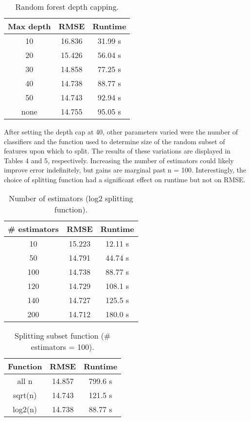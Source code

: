 \documentclass[11pt]{article}
\begin{document}
	\begin{table}[h!]
		\begin{center}
			\caption{Random forest depth capping.}
			\begin{tabular}{ c c c }
				\hline
				Max depth & RMSE & Runtime \\ \hline
				10 & 16.836 & 31.99 s \\
				20 & 15.426 & 56.04 s \\
				30 & 14.858 & 77.25 s \\
				40 & 14.738 & 88.77 s \\
				50 & 14.743 & 92.94 s \\
				none & 14.755 & 95.05 s \\
				\hline
			\end{tabular}
		\end{center}
	\end{table}
	
	After setting the depth cap at 40, other parameters varied
	were the number of classifiers and the function used to
	determine size of the random subset of features upon which
	to split. The results of these variations are displayed in Tables
	4 and 5, respectively. Increasing the number of estimators could 
	likely improve error indefinitely, but gains are marginal
	past n = 100. Interestingly,
	the choice of splitting function had a significant effect on
	runtime but not on RMSE.
	
	\begin{table}[h!]
		\begin{center}
			\caption{Number of estimators (log2 splitting function).}
			\begin{tabular}{ c c c }
				\hline
				\# estimators & RMSE & Runtime \\ \hline
				10 & 15.223 & 12.11 s \\
				50 & 14.791 & 44.74 s \\
				100 & 14.738 & 88.77 s \\
				120 & 14.729 & 108.1 s \\
				140 & 14.727 & 125.5 s \\
				200 & 14.712 & 180.0 s \\
				\hline
			\end{tabular}
		\end{center}
	\end{table}
	
	\begin{table}[h!]
		\begin{center}
			\caption{Splitting subset function (\# estimators = 100).}
			\begin{tabular}{ c c c }
				\hline
				Function & RMSE & Runtime \\ \hline
				all n & 14.857 & 799.6 s \\
				sqrt(n) & 14.743 & 121.5 s \\
				log2(n) & 14.738 & 88.77 s \\
				\hline
			\end{tabular}
		\end{center}
	\end{table}
	
\end{document}
